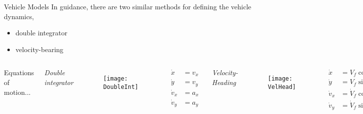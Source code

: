 \begin{frame}{Vehicle Models}
	In guidance, there are two similar methods for defining the vehicle dynamics,
	\begin{itemize}
	\item double integrator
	\item velocity-bearing 
	\end{itemize}
	\vspace{-10pt}
	\begin{columns}[T]
	\column{1.5cm}
	\vspace{3.5cm}
	Equations of motion...
	\begin{center}
	\textit{Double integrator}
	\end{center}
	\vspace{-20pt}
	\begin{figure}
			\centering
			\texttt{[image: DoubleInt]}
	\end{figure}
	\vspace{-25pt}
	\begin{align*}
	\dot{x} &= v_x\\
	\dot{y} &= v_y\\
	\dot{v}_x &= a_x\\
	\dot{v}_y &= a_y
	\end{align*}
	
	\begin{center}
	\textit{Velocity-Heading}
	\end{center}
	\vspace{-20pt}
	\begin{figure}
			\centering
			\texttt{[image: VelHead]}
	\end{figure}
	\vspace{-20pt}
	\begin{align*}
	\dot{x} &= V_f \cos \lambda\\
	\dot{y} &= V_f \sin \lambda\\
	\dot{v}_x &= \dot{V}_f \cos \lambda - V_f \sin \lambda \dot{\lambda}\\
	\dot{v}_y &= \dot{V}_f \sin \lambda + V_f \cos \lambda \dot{\lambda}
	\end{align*}
	\end{columns}
\end{frame}

